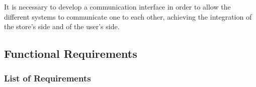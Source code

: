 \documentclass{article}
\renewcommand{\arraystretch}{1.6}
\begin{document}
			It is necessary to develop a communication interface in order to allow the different systems to communicate one to each other, achieving the integration of the store’s side and of the user’s side.
		
	\subsection{Functional Requirements}
	
		\subsubsection{List of Requirements}
		
			\begin{center}
				
				\setlength\LTleft{-50pt}
				
				\renewcommand{\arraystretch}{2}
				
				\begin{adjustwidth}{-1.5cm}{}
					\begin{longtable}[h!]{|m{2.5em}|m{32.5em}|}
						

\end{longtable}
\end{adjustwidth}
\end{center}
\end{document}
